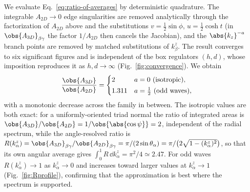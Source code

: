 We evaluate Eq.~\eqref{eq:ratio-of-averages} by deterministic quadrature. The integrable $A_{2D}\to0$ edge singularities are removed analytically through the factorization of $A_{2D}$ above and the substitutions $v=\tfrac12\sin\phi$, $u=\tfrac12\cosh t$ (in $\obs{A_{3D}}_{\beta\gamma}$ the factor $1/A_{2D}$ then cancels the Jacobian), and the $\abs{k_z}^{-a}$ branch points are removed by matched substitutions of $k_\beta^z$. The result converges to six significant figures and is independent of the box regulators $(h,d)$, whose imposition reproduces it as $h,d\to\infty$ (Fig.~\ref{fig:convergence}). We obtain
\begin{align}
    \frac{\obs{A_{3D}}}{\obs{A_{2D}}} = \begin{cases} 2 & a=0 \ (\text{isotropic}),\\[2pt] 1.311 & a=\tfrac12 \ (\text{odd waves}),\end{cases}
\end{align}
with a monotonic decrease across the family in between. The isotropic values are both exact: for a uniformly-oriented triad normal the ratio of integrated areas is $\obs{A_{3D}}/\obs{A_{2D}}=1/\obs{\abs{\cos\psi}}=2$, independent of the radial spectrum, while the angle-resolved ratio is $R(k_\alpha^z)=\obs{A_{3D}}_{\beta\gamma}/\obs{A_{2D}}_{\beta\gamma}=\pi/(2\sin\theta_\alpha)=\pi/\big(2\sqrt{1-(k_\alpha^z)^2}\big)$, so that its own angular average gives $\int_0^1 R\,\dd k_\alpha^z=\pi^2/4\simeq2.47$. For odd waves $R(k_\alpha^z)\to1$ as $k_\alpha^z\to0$ and increases toward larger values at $k_\alpha^z\to1$ (Fig.~\ref{fig:Rprofile}), confirming that the approximation is best where the spectrum is supported.
